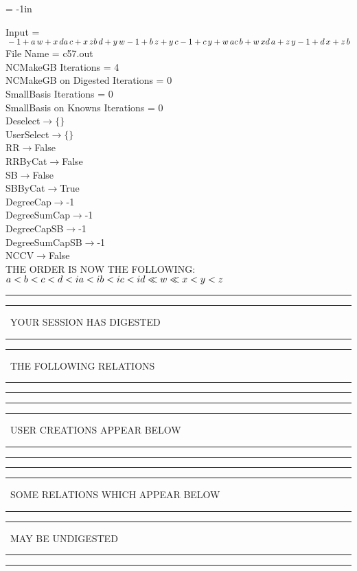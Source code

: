 \voffset = -1in
\evensidemargin 0.1in
\oddsidemargin 0.1in
\textheight 9in
\textwidth 6in

\normalsize
\baselineskip=12pt
\noindent
Input = 
$
\\-1 + a\,
 w + x\,
 d\\
a\,
 c + x\,
 z\\
b\,
 d + y\,
 w\\
-1 + b\,
 z + y\,
 c\\
-1 + c\,
 y + w\,
 a\\
c\,
 b + w\,
 x\\
d\,
 a + z\,
 y\\
-1 + d\,
 x + z\,
 b\\
$
File Name = c57.out\\
NCMakeGB Iterations = 4\\
NCMakeGB on Digested Iterations = 0\\
SmallBasis Iterations = 0\\
SmallBasis on Knowns Iterations = 0\\
Deselect$\rightarrow \{\}$\\
UserSelect$\rightarrow \{\}$\\
RR$\rightarrow $False\\
RRByCat$\rightarrow $False\\
SB$\rightarrow $False\\
SBByCat$\rightarrow $True\\
DegreeCap$\rightarrow $-1\\
DegreeSumCap$\rightarrow $-1\\
DegreeCapSB$\rightarrow $-1\\
DegreeSumCapSB$\rightarrow $-1\\
NCCV$\rightarrow $False\\
THE ORDER IS NOW THE FOLLOWING:\hfil\break
$
a<b<c<d<ia<ib<ic<id\ll
w\ll
x<y<z\\
$
\rule[2pt]{6in}{4pt}\hfil\break
\rule[2pt]{1.879in}{4pt}
\ YOUR SESSION HAS DIGESTED\ 
\rule[2pt]{1.879in}{4pt}\hfil\break
\rule[2pt]{1.923in}{4pt}
\ THE FOLLOWING RELATIONS\ 
\rule[2pt]{1.923in}{4pt}\hfil\break
\rule[2pt]{6in}{4pt}\hfil\break
\rule[2pt]{6in}{1pt}\hfil\break
\rule[2.5pt]{1.701in}{1pt}
\ USER CREATIONS APPEAR BELOW\ 
\rule[2.5pt]{1.701in}{1pt}\hfil\break
\rule[2pt]{6in}{1pt}\hfil\break
\rule[2pt]{6in}{4pt}\hfil\break
\rule[2pt]{1.45in}{4pt}
\ SOME RELATIONS WHICH APPEAR BELOW\ 
\rule[2pt]{1.45in}{4pt}\hfil\break
\rule[2pt]{2.18in}{4pt}
\ MAY BE UNDIGESTED\ 
\rule[2pt]{2.18in}{4pt}\hfil\break
\rule[2pt]{6in}{4pt}\hfil\break
